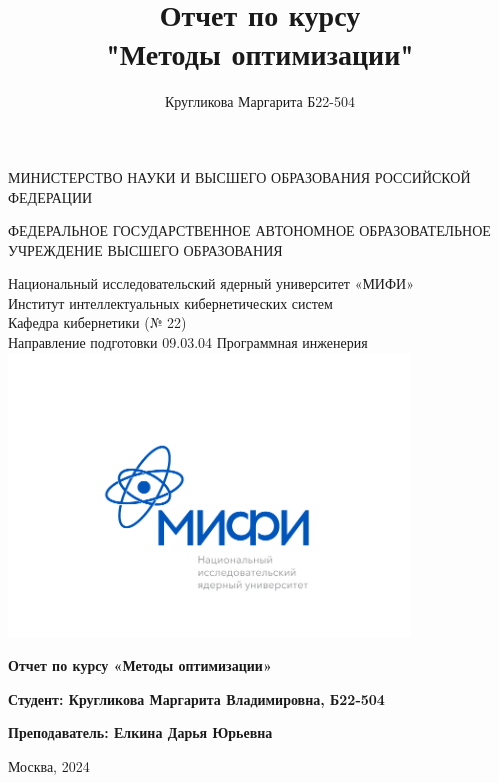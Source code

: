 \documentclass[a4paper, 14pt]{report}
\title{\huge Отчет по курсу \\"Методы оптимизации"}
\author{\huge Кругликова Маргарита Б22-504}
\date{}
\begin{document}
\begin{titlepage}
	\begin{center}
        МИНИСТЕРСТВО НАУКИ И ВЫСШЕГО ОБРАЗОВАНИЯ РОССИЙСКОЙ ФЕДЕРАЦИИ\\

        \vspace*{0.5cm}

        ФЕДЕРАЛЬНОЕ ГОСУДАРСТВЕННОЕ АВТОНОМНОЕ ОБРАЗОВАТЕЛЬНОЕ УЧРЕЖДЕНИЕ ВЫСШЕГО ОБРАЗОВАНИЯ\\
        
        \vspace*{0.5cm}

        Национальный исследовательский ядерный университет «МИФИ»\\
        Институт интеллектуальных кибернетических систем\\
        Кафедра кибернетики (№ 22)\\
        Направление подготовки 09.03.04 Программная инженерия\\

        \includegraphics[width=0.8\textwidth]{mifi.png}

		{\Large \textbf{Отчет по курсу «Методы оптимизации»}}

		\vspace{1.5cm}

		\textbf{Студент: Кругликова Маргарита Владимировна, Б22-504}

		\vspace{0.3cm}

		\textbf{Преподаватель: Елкина Дарья Юрьевна}

        \vfill

        Москва, 2024
	\end{center}
\end{titlepage}

\tableofcontents












\end{document}
